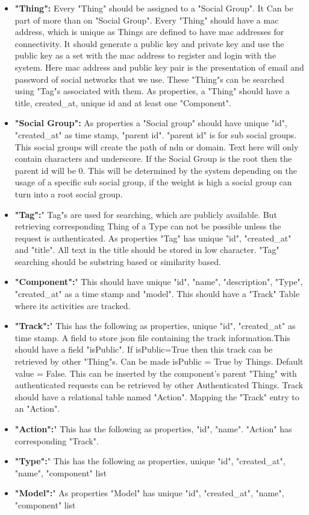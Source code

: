 \documentclass[conference]{IEEEtran}
\begin{document}
\begin{itemize}
  \item 
 \textbf{"Thing":}
 Every "Thing" should be assigned to a "Social Group". It Can be part of more than on "Social Group". Every "Thing" should have a mac address, which is unique as Things are defined to have mac addresses for connectivity. It should generate a public key and private key and use the public key as a set with the mac address to register and login with the system. Here mac address and public key pair is the presentation of email and password of social networks that we use. These "Thing"s can be searched using "Tag"s associated with them. As properties, a "Thing" should have a title, created\_at, unique id and at least one "Component".

\item
 \textbf{"Social Group":} As properties a "Social group" should have unique "id", "created\_at" as time stamp, "parent id". "parent id" is for sub social groups. This social groups will create the path of ndn or domain. Text here will only contain characters and underscore. If the Social Group is the root then the parent id will be 0. This will be determined by the system depending on the usage of a specific sub social group, if the weight is high a social group can turn into a root social group.

\item 
 \textbf{"Tag":}" Tag"s are used for searching, which are publicly available. But retrieving corresponding Thing of a Type can not be possible unless the request is authenticated. As properties "Tag" has unique "id", "created\_at" and "title". All text in the title should be stored in low character. "Tag" searching should be substring based or similarity based.


\item 
 \textbf{"Component":}" This should have unique "id", "name", "description", "Type", "created\_at" as a time stamp and "model". This should have a "Track" Table where its activities are tracked.

\item \textbf{"Track":}" This has the following as properties, unique "id", "created\_at" as time stamp. A field to store json file containing the track information.This should have a field "isPublic". If isPublic=True then this track can be retrieved by other "Thing"s. Can be made isPublic = True by Things. Default value = False. This can be inserted by the component's parent "Thing" with authenticated requests can be retrieved by other Authenticated Things. Track should have a relational table named "Action". Mapping the "Track" entry to an "Action".

\item \textbf{"Action":}" This has the following as properties, "id", "name". "Action" has corresponding "Track".

\item \textbf{"Type":}" This has the following as properties, unique "id", "created\_at", "name", "component" list

\item \textbf{"Model":}" As properties "Model" has unique "id", "created\_at", "name", "component" list
\end{itemize}
\end{document}
